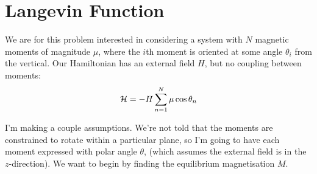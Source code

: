 \documentclass[../../PS3.tex]{subfiles}
\begin{document}
\section{Langevin Function}

We are for this problem interested in considering a system with $N$ magnetic moments of magnitude $\mu$, where the $i$th moment is oriented at some angle $\theta_i$ from the vertical. Our Hamiltonian has an external field $H$, but no coupling between moments:
\begin{equation}
	\mathcal{H} = - H \sum_{n = 1}^{N} \mu \cos{\theta_n}
\end{equation}

I'm making a couple assumptions. We're not told that the moments are constrained to rotate within a particular plane, so I'm going to have each moment expressed with polar angle $\theta$, (which assumes the external field is in the $z$-direction). We want to begin by finding the equilibrium magnetisation $M$. 
\end{document}
